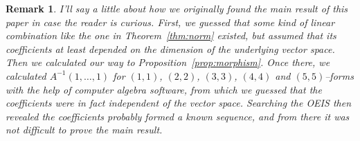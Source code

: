 \documentclass[11pt,a4paper]{amsart}
\theoremstyle{slthm}
\theoremstyle{sldef}
\theoremstyle{slrem}
\newtheorem*{rema}{Remark}
\numberwithin{equation}{section}
\begin{document}
\begin{rema}
I'll say a little about how we originally found the main result of this
paper in case the reader is curious. First, we guessed that some kind of
linear combination like the one in Theorem~\ref{thm:norm} existed, but
assumed that its coefficients at least depended on the dimension of the
underlying vector space. Then we calculated our way to
Proposition~\ref{prop:morphism}. Once there, we calculated
$A^{-1}(1,\ldots,1)$ for $(1,1)$, $(2,2)$, $(3,3)$, $(4,4)$ and
$(5,5)$--forms with the help of computer algebra software, from which we
guessed that the coefficients were in fact independent of the vector space.
Searching the OEIS then revealed the coefficients probably formed a known
sequence, and from there it was not difficult to prove the main result.  
\end{rema}
\end{document}
